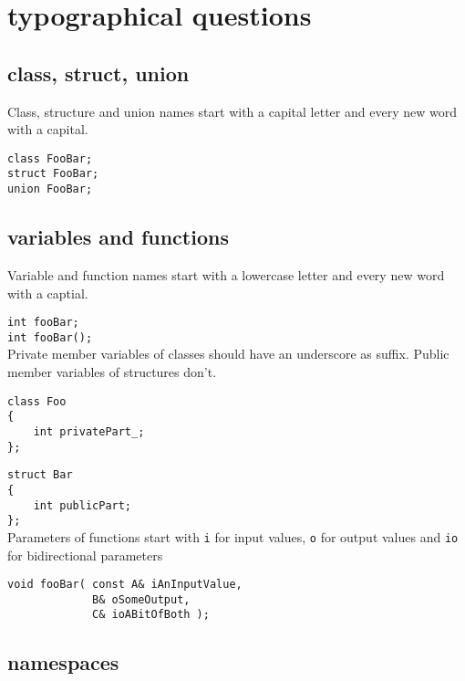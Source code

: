 \documentclass[10pt,a4paper,titlepage,dutch]{report}
\begin{document}
\section{typographical questions}

\subsection{class, struct, union}

Class, structure and union names start with a capital letter and
every new word with a capital.

\verb|class FooBar;|\\
\verb|struct FooBar;|\\
\verb|union FooBar;|\\

\subsection{variables and functions}

Variable and function names start with a lowercase letter and
every new word with a captial.

\verb|int fooBar;|\\
\verb|int fooBar();|\\

Private member variables of classes should have an underscore as
suffix.  Public member variables of structures don't.

\verb|class Foo|\\
\verb|{|\\
\verb|    int privatePart_;|\\
\verb|};|

\verb|struct Bar|\\
\verb|{|\\
\verb|    int publicPart;|\\
\verb|};|\\

Parameters of functions start with \verb|i| for input values,
\verb|o| for output values and \verb|io| for bidirectional
parameters

\verb|void fooBar( const A& iAnInputValue, |\\
\verb|             B& oSomeOutput, |\\
\verb|             C& ioABitOfBoth );|\\

\subsection{namespaces}
\end{document}
